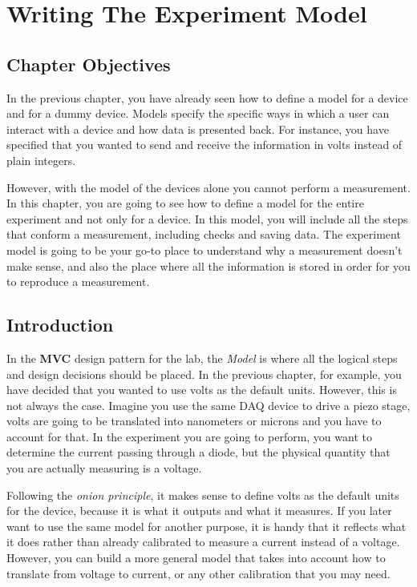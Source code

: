 \chapter{Writing The Experiment Model}\label{writing-our-experimentmodel}

\section{Chapter Objectives}\label{chapterobjectives}
In the previous chapter, you have already seen how to define a model for
a device and for a dummy device. Models specify the specific ways in
which a user can interact with a device and how data is presented back.
For instance, you have specified that you wanted to send and receive the
information in volts instead of plain integers.

However, with the model of the devices alone you cannot perform a
measurement. In this chapter, you are going to see how to define a model
for the entire experiment and not only for a device. In this model, you
will include all the steps that conform a measurement, including checks
and saving data. The experiment model is going to be your go-to place to
understand why a measurement doesn't make sense, and also the place
where all the information is stored in order for you to reproduce
a measurement.

\section{Introduction}\label{introduction}
In the \textbf{MVC} design pattern for the lab, the \emph{Model} is
where all the logical steps and design decisions should be placed. In
the previous chapter, for example, you have decided that you wanted to
use volts as the default units. However, this is not always the case.
Imagine you use the same {DAQ} device to drive a piezo stage, volts are
going to be translated into nanometers or microns and you have to
account for that. In the experiment you are going to perform, you want
to determine the current passing through a diode, but the physical
quantity that you are actually measuring is a voltage.

Following the \emph{onion principle}, it makes sense to define volts as
the default units for the device, because it is what it outputs and what
it measures. If you later want to use the same model for another
purpose, it is handy that it reflects what it does rather than already
calibrated to measure a current instead of a voltage. However, you can
build a more general model that takes into account how to translate from
voltage to current, or any other calibration that you may need.

